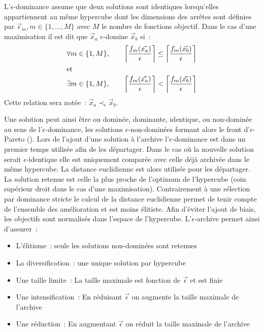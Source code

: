 \begin{Def}\label{def:eps_dominance}
L’$\epsilon$-dominance assume que deux solutions sont identiques lorsqu’elles appartiennent
au même hypercube dont les dimensions des arrêtes sont définies par
$\vec{\epsilon}_{m}, m \in \{1, \dotsc, M\}$ avec $M$ le nombre de fonctions objectif.
Dans le cas d’une maximisation il est dit que $\vec{x}_{a}$ $\epsilon$-domine $\vec{x}_{b}$ si~:
\begin{align*}
  \forall m \in \{1, M\}, \qquad
  \left\lceil\frac{f_{m}(\vec{x_{a}})}{\epsilon}\right\rceil &\leq
  \left\lceil\frac{f_{m}(\vec{x_{b}})}{\epsilon}\right\rceil  \\
  \intertext{et}
  \exists m \in \{1, M\}, \qquad
  \left\lceil\frac{f_{m}(\vec{x_{a}})}{\epsilon}\right\rceil &<
  \left\lceil\frac{f_{m}(\vec{x_{b}})}{\epsilon}\right\rceil  \\
\end{align*}
Cette relation sera notée~: $\vec{x}_{a} \prec_{\epsilon} \vec{x}_{b}$.
\end{Def}

Une solution peut ainsi être ou dominée, dominante, identique, ou non-dominée au sens de
l’$\epsilon$-dominance, les solutions $\epsilon$-non-dominées formant alors le front
d’$\epsilon$-Pareto (). Lors de l’ajout d’une solution à
l’archive l’$\epsilon$-dominance est dans un premier temps utilisée afin de les
départager. Dans le cas où la nouvelle solution serait $\epsilon$-identique elle est
uniquement comparée avec celle déjà archivée dans le même hypercube. La distance
euclidienne est alors utilisée pour les départager. La solution retenue est celle la plus
proche de l’optimum de l’hypercube (coin supérieur droit dans le cas d’une maximisation).
Contrairement à une sélection par dominance stricte le calcul de la distance euclidienne
permet de tenir compte de l’ensemble des amélioration et est moins élitiste. Afin d’éviter
l’ajout de biais, les objectifs sont normalisés dans l’espace de l’hypercube.
L’$\epsilon$-archive permet ainsi d’assurer~:
\begin{itemize}
  \item L’élitisme~: seule les solutions non-dominées sont retenues
  \item La diversification~: une unique solution par hypercube
  \item Une taille limite~: La taille maximale est fonction de $\vec{\epsilon}$ et est finie
  \item Une intensification~: En réduisant $\vec{\epsilon}$ on augmente la taille maximale de l’archive
  \item Une réduction~: En augmentant $\vec{\epsilon}$ on réduit la taille maximale de l’archive
\end{itemize}

